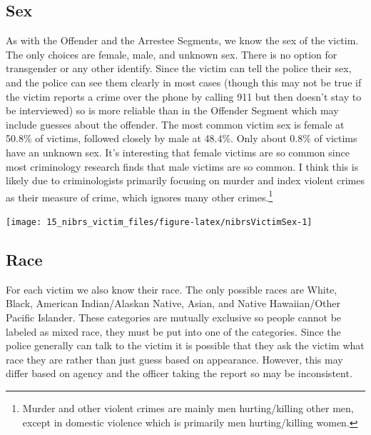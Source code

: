 \documentclass[
]{krantz}
\let\origfigure\figure
\let\endorigfigure\endfigure
\renewenvironment{figure}[1][2] {
    \expandafter\origfigure\expandafter[H]
} {
    \endorigfigure
}
\begin{document}
\subsection{Sex}\label{sex-2}

As with the Offender and the Arrestee Segments, we know the
sex of the victim. The only choices are female, male, and
unknown sex. There is no option for transgender or any other
identify. Since the victim can tell the police their sex,
and the police can see them clearly in most cases (though
this may not be true if the victim reports a crime over the
phone by calling 911 but then doesn't stay to be
interviewed) so is more reliable than in the Offender
Segment which may include guesses about the offender. The
most common victim sex is female at 50.8\% of victims,
followed closely by male at 48.4\%. Only about 0.8\% of
victims have an unknown sex. It's interesting that female
victims are so common since most criminology research finds
that male victims are so common. I think this is likely due
to criminologists primarily focusing on murder and index
violent crimes as their measure of crime, which ignores many
other crimes.\footnote{Murder and other violent crimes are
  mainly men hurting/killing other men, except in domestic
  violence which is primarily men hurting/killing women.}

\begin{figure}

{\centering \texttt{[image: 15\_nibrs\_victim\_files/figure-latex/nibrsVictimSex-1]} 

}

\caption{The share of victims by sex, 1991-2022.}\label{fig:nibrsVictimSex}
\end{figure}

\subsection{Race}\label{race-3}

For each victim we also know their race. The only possible
races are White, Black, American Indian/Alaskan Native,
Asian, and Native Hawaiian/Other Pacific Islander. These
categories are mutually exclusive so people cannot be
labeled as mixed race, they must be put into one of the
categories. Since the police generally can talk to the
victim it is possible that they ask the victim what race
they are rather than just guess based on appearance.
However, this may differ based on agency and the officer
taking the report so may be inconsistent.
\end{document}
